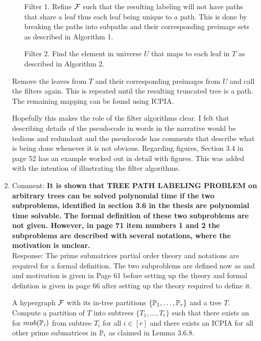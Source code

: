 \documentclass[12pt,a4paper]{article}
\begin{document}
\begin{enumerate}
{\em \begin{enumerate}
\item [Filter 1.] \filteri Refine ${\cal F}$ such that the resulting
  labeling will not have paths that share a leaf thus each leaf being
  unique to a path. This is done by breaking the paths into subpaths and their
  corresponding preimage sets as described in Algorithm 1.
\item [Filter 2.] \filterii Find the element in universe $U$ that maps to each
  leaf in $T$ as described in Algorithm 2. 
\end{enumerate}
Remove the leaves from $T$ and their corresponding preimages from $U$
and call the filters again. This is repeated until the resulting
truncated tree is a path. The remaining mapping can be found using
ICPIA.
}

Hopefully this makes the role of the filter algorithms clear.
I felt that describing details of the pseudocode in words in the narrative would
be tedious and redundant and the pseudocode has comments that describe what is being
done whenever it is not obvious. Regarding figures, Section 3.4 in
page 52 has an example worked out in detail with figures. This was
added with the intention of illustrating the filter algorithms.


\item Comment: {\bf It is shown that TREE PATH LABELING PROBLEM on
    arbitrary trees can be solved polynomial time if the two
    subproblems, identified in section 3.6 in the thesis are
    polynomial time solvable. The formal definition of these two
    subproblems are not given. However, in page 71 item numbers 1 and
    2 the subproblems are described with several notations, where the
    motivation is unclear.}\\
Response: The prime submatrices partial order theory and notations are
required for a formal definition.
The two subproblems are defined now as \FOCPS and \FMFT and motivation is
given in Page 61 before setting up the theory and formal defintion is
given in page 66 after setting up the theory required to define it.

{\em

\begin{problemdef}{\FOCPS}{A hypergraph ${\cal F}$ with its in-tree
    partitions $\{\mathbb P_1,\ldots,\mathbb P_r\}$ and
    a tree $T$.}
  Compute a partition of $T$ into subtrees $\{T_1, \ldots, T_r\}$ such
  that there exists an \ICPPL for $mub(\mathbb P_i)$ from subtree
  $T_i$ for all $i \in [r]$ and there exists an ICPIA for all other
  prime submatrices in $\mathbb P_i$ as claimed in Lemma 3.6.8.
\end{problemdef}

}
\end{enumerate}
\end{document}

